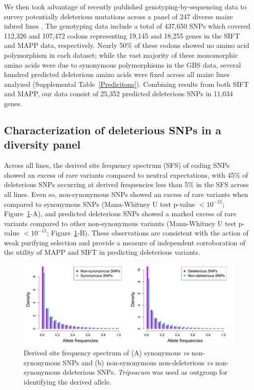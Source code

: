 \documentclass[12pt]{article}
\begin{document}
We then took advantage of recently published genotyping-by-sequencing \citep[GBS; ][]{Elshire2011} data to survey potentially deleterious mutations across a panel of 247 diverse maize inbred lines \citep{Larsson2013, Romay2013}. The genotyping data include a total of  437,650 SNPs which covered 112,326 and 107,472 codons representing 19,145 and 18,255 genes in the SIFT and MAPP data, respectively. Nearly 50\% of these codons showed no amino acid polymorphism in each dataset; while the vast majority of these monomorphic amino acids were due to synonymous polymorphisms in the GBS data, several hundred predicted deleterious amino acids were fixed across all maize lines analyzed (Supplemental Table~\ref{Predicitons}). Combining results from both SIFT and MAPP, our data consist of 25,352 predicted deleterious SNPs in 11,034 genes.

\subsection*{Characterization of deleterious SNPs in a diversity panel}

Across all lines, the derived site frequency spectrum (SFS) of coding SNPs showed an excess of rare variants compared to neutral expectations, with 45\% of deleterious SNPs occurring at derived frequencies less than 5\% in the SFS across all lines. 
Even so, non-synonymous SNPs showed an excess of rare variants when compared to synonymous SNPs (Mann-Whitney U test p-value $<10^{-15}$; Figure~\ref{sfs_non_syn}-A), and predicted deleterious SNPs showed a marked excess of rare variants compared to other non-synonymous variants (Mann-Whitney U test p-value $<10^{-15}$; Figure~\ref{sfs_non_syn}-B). These observations are consistent with the action of weak purifying selection \citep{Cummings1998,Fay2001} and provide a measure of independent corroboration of the utility of MAPP and SIFT in predicting deleterious variants.

\begin{figure}[!b]
  \begin{center}
   \includegraphics[width=150mm]{SFS.png}
    \caption{Derived site frequency spectrum of (A) synonymous \emph{vs} non-synonymous SNPs and (b) non-synonymous non-deleterious \emph{vs} non-synonymous deleterious SNPs. \emph{Tripsacum} was used as outgroup for identifying the derived allele.} 
\label{sfs_non_syn}
  \end{center}
\end{figure}
\end{document}
